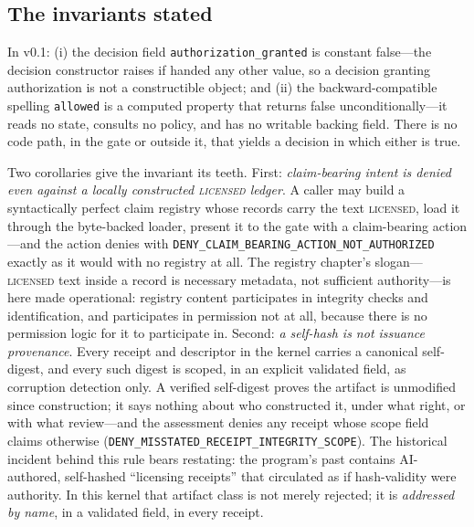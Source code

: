 \subsection{The invariants stated}\label{ch09:invariants-stated}

\begin{invariant}\label{ch09:inv:no-yes}
In v0.1: (i) the decision field \texttt{authorization\_granted} is constant false---the decision constructor raises if handed any other value, so a decision granting authorization is not a constructible object; and (ii) the backward-compatible spelling \texttt{allowed} is a computed property that returns false unconditionally---it reads no state, consults no policy, and has no writable backing field. There is no code path, in the gate or outside it, that yields a decision in which either is true.
\end{invariant}

Two corollaries give the invariant its teeth. First: \emph{claim-bearing intent is denied even against a locally constructed \textsc{licensed} ledger}. A caller may build a syntactically perfect claim registry whose records carry the text \textsc{licensed}, load it through the byte-backed loader, present it to the gate with a claim-bearing action---and the action denies with \texttt{DENY\_CLAIM\_BEARING\_ACTION\_NOT\_AUTHORIZED} exactly as it would with no registry at all. The registry chapter's slogan---\textsc{licensed} text inside a record is necessary metadata, not sufficient authority---is here made operational: registry content participates in integrity checks and identification, and participates in permission not at all, because there is no permission logic for it to participate in. Second: \emph{a self-hash is not issuance provenance}. Every receipt and descriptor in the kernel carries a canonical self-digest, and every such digest is scoped, in an explicit validated field, as corruption detection only. A verified self-digest proves the artifact is unmodified since construction; it says nothing about who constructed it, under what right, or with what review---and the assessment denies any receipt whose scope field claims otherwise (\texttt{DENY\_MISSTATED\_RECEIPT\_INTEGRITY\_SCOPE}). The historical incident behind this rule bears restating: the program's past contains AI-authored, self-hashed ``licensing receipts'' that circulated as if hash-validity were authority. In this kernel that artifact class is not merely rejected; it is \emph{addressed by name}, in a validated field, in every receipt.

